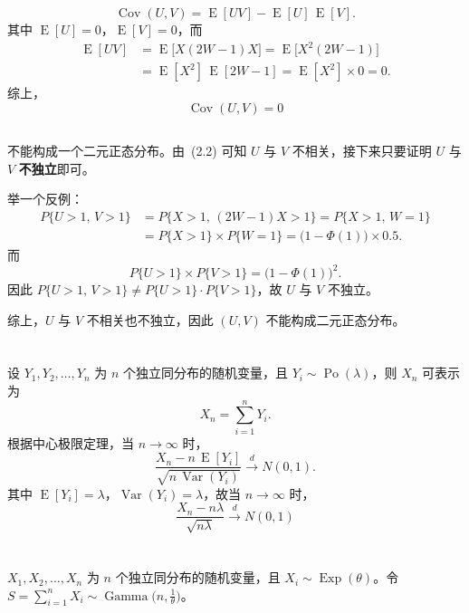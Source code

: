 \documentclass[12pt,a4paper]{article}
\newcommand{\Cov}{\operatorname{Cov}}
\newcommand{\Var}{\operatorname{Var}}
\newcommand{\E}{\operatorname{E}}
\newcommand{\Exp}{\operatorname{Exp}}
\newcommand{\Po}{\operatorname{Po}}
\newcommand{\Ga}{\operatorname{Gamma}}
\begin{document}
\[
  \Cov(U,V)=\E[UV]-\E[U]\,\E[V].
\]
其中 $\E[U]=0$，$\E[V]=0$，而
\begin{align*}
  \E[UV]
  &=\E\bigl[X(2W-1)X\bigr]
   =\E\bigl[X^{2}(2W-1)\bigr]\\
  &=\E[X^{2}]\,\E[2W-1]
   =\E[X^{2}]\times0=0.
\end{align*}
综上，
\[
  \boxed{\Cov(U,V)=0}
\]

\subsection{}

不能构成一个二元正态分布。由~(2.2) 可知 $U$ 与 $V$ 不相关，接下来只要证明 $U$ 与 $V$ \textbf{不独立}即可。

举一个反例：
\begin{align*}
  P\{U>1,\,V>1\}
  &=P\{X>1,\,(2W-1)X>1\}
   =P\{X>1,\,W=1\}\\
  &=P\{X>1\}\times P\{W=1\}
   =\bigl(1-\Phi(1)\bigr)\times0.5.
\end{align*}
而
\[
  P\{U>1\}\times P\{V>1\}=\bigl(1-\Phi(1)\bigr)^{2}.
\]
因此 $P\{U>1,\,V>1\}\neq P\{U>1\}\cdot P\{V>1\}$，故 $U$ 与 $V$ 不独立。

综上，$U$ 与 $V$ 不相关也不独立，因此 $(U,V)$ 不能构成二元正态分布。

\section{}

设 $Y_{1},Y_{2},\ldots,Y_{n}$ 为 $n$ 个独立同分布的随机变量，且 $Y_{i}\sim\Po(\lambda)$，则 $X_{n}$ 可表示为
\[
  X_{n}=\sum_{i=1}^{n}Y_{i}.
\]
根据中心极限定理，当 $n\to\infty$ 时，
\[
  \frac{X_{n}-n\,\E[Y_{i}]}{\sqrt{n\,\Var(Y_{i})}}\xrightarrow{d}N(0,1).
\]
其中 $\E[Y_{i}]=\lambda$，$\Var(Y_{i})=\lambda$，故当 $n\to\infty$ 时，
\[
  \boxed{\frac{X_{n}-n\lambda}{\sqrt{n\lambda}}\xrightarrow{d}N(0,1)}
\]

\section{}

$X_{1},X_{2},\ldots,X_{n}$ 为 $n$ 个独立同分布的随机变量，且 $X_{i}\sim\Exp(\theta)$。令 $S=\sum_{i=1}^{n}X_{i}\sim\Ga\!\bigl(n,\tfrac{1}{\theta}\bigr)$。
\end{document}

